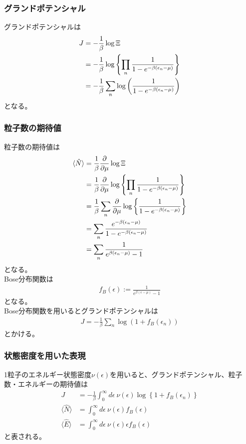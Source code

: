 \documentclass{jsarticle}  %
\numberwithin{equation}{section} %
\numberwithin{figure}{section}
\begin{document}
\subsubsection{グランドポテンシャル}
    グランドポテンシャルは
    \begin{align}
        J &= -\frac{1}{\beta} \log \Xi \notag \\
        &= -\frac{1}{\beta} \log \left\{  \prod_n \frac{1}{1 - e^{-\beta (\epsilon_n - \mu)}} \right\} \notag \\
        &= -\frac{1}{\beta} \sum_n \log \left( \frac{1}{1 - e^{-\beta (\epsilon_n - \mu)}} \right)
    \end{align}
    となる。
\subsubsection{粒子数の期待値}
    粒子数の期待値は
    \begin{align}
        \langle \hat{N} \rangle &= \frac{1}{\beta} \frac{\partial }{\partial \mu} \log \Xi \notag \\
        &= \frac{1}{\beta} \frac{\partial }{\partial \mu} \log \left\{ \prod_n \frac{1}{1 - e^{-\beta (\epsilon_n - \mu)}} \right\} \notag \\
        &= \frac{1}{\beta} \sum_n \frac{\partial }{\partial \mu} \log \left\{ \frac{1}{1 - e^{-\beta (\epsilon_n - \mu)}} \right\} \notag \\
        &= \sum_n \frac{e^{-\beta (\epsilon_n - \mu)}}{1 - e^{-\beta (\epsilon_n - \mu)}} \notag \\
        &= \sum_n \frac{1}{e^{\beta (\epsilon_n - \mu)} - 1}
    \end{align}
    となる。\\
    Bose分布関数は
    \begin{align}
        f_B (\epsilon) := \frac{1}{e^{\beta (\epsilon - \mu)} - 1}
    \end{align}
    となる。\\
    Bose分布関数を用いるとグランドポテンシャルは
    \begin{align}
        J = -\frac{1}{\beta} \sum_n \log (1 + f_B (\epsilon_n))
    \end{align}
    とかける。
\subsubsection{状態密度を用いた表現}
    1粒子のエネルギー状態密度$\nu (\epsilon)$を用いると、グランドポテンシャル、粒子数・エネルギーの期待値は
    \begin{align}
        J &= -\frac{1}{\beta} \int_{0}^{\infty} d\epsilon\ \nu (\epsilon) \log \left\{ 1 + f_B (\epsilon_n) \right\} \\
        \langle \hat{N} \rangle &= \int_0^{\infty} d\epsilon\ \nu (\epsilon) f_B(\epsilon) \\
        \langle \hat{E} \rangle &= \int_0^{\infty} d\epsilon\  \nu (\epsilon) \epsilon f_B(\epsilon)
    \end{align}
    と表される。
\end{document}
